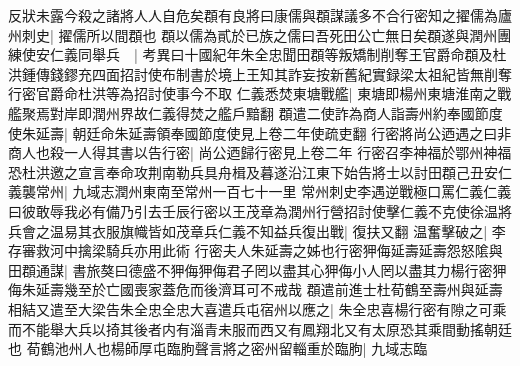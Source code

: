 反狀未露今殺之諸將人人自危矣頵有良將曰康儒與頵謀議多不合行密知之擢儒為廬州刺史|{
	擢儒所以間頵也}
頵以儒為貳於已族之儒曰吾死田公亡無日矣頵遂與潤州團練使安仁義同舉兵　|{
	考異曰十國紀年朱全忠聞田頵等叛矯制削奪王官爵命頵及杜洪鍾傳錢鏐充四面招討使布制書於境上王知其詐妄按新舊紀實録梁太祖紀皆無削奪行密官爵命杜洪等為招討使事今不取}
仁義悉焚東塘戰艦|{
	東塘即楊州東塘淮南之戰艦聚焉對岸即潤州界故仁義得焚之艦戶黯翻}
頵遣二使詐為商人詣壽州約奉國節度使朱延壽|{
	朝廷命朱延壽領奉國節度使見上卷二年使疏吏翻}
行密將尚公迺遇之曰非商人也殺一人得其書以告行密|{
	尚公迺歸行密見上卷二年}
行密召李神福於鄂州神福恐杜洪邀之宣言奉命攻荆南勒兵具舟楫及暮遂沿江東下始告將士以討田頵己丑安仁義襲常州|{
	九域志潤州東南至常州一百七十一里}
常州刺史李遇逆戰極口罵仁義仁義曰彼敢辱我必有備乃引去壬辰行密以王茂章為潤州行營招討使擊仁義不克使徐温將兵會之温易其衣服旗幟皆如茂章兵仁義不知益兵復出戰|{
	復扶又翻}
温奮擊破之|{
	李存審救河中擒梁騎兵亦用此術}
行密夫人朱延壽之姊也行密狎侮延壽延壽怨怒隂與田頵通謀|{
	書旅獒曰德盛不狎侮狎侮君子罔以盡其心狎侮小人罔以盡其力楊行密狎侮朱延壽幾至於亡國喪家蓋危而後濟耳可不戒哉}
頵遣前進士杜荀鶴至壽州與延壽相結又遣至大梁告朱全忠全忠大喜遣兵屯宿州以應之|{
	朱全忠喜楊行密有隙之可乘而不能舉大兵以掎其後者内有淄青未服而西又有鳳翔北又有太原恐其乘間動搖朝廷也}
荀鶴池州人也楊師厚屯臨朐聲言將之密州留輜重於臨朐|{
	九域志臨}


